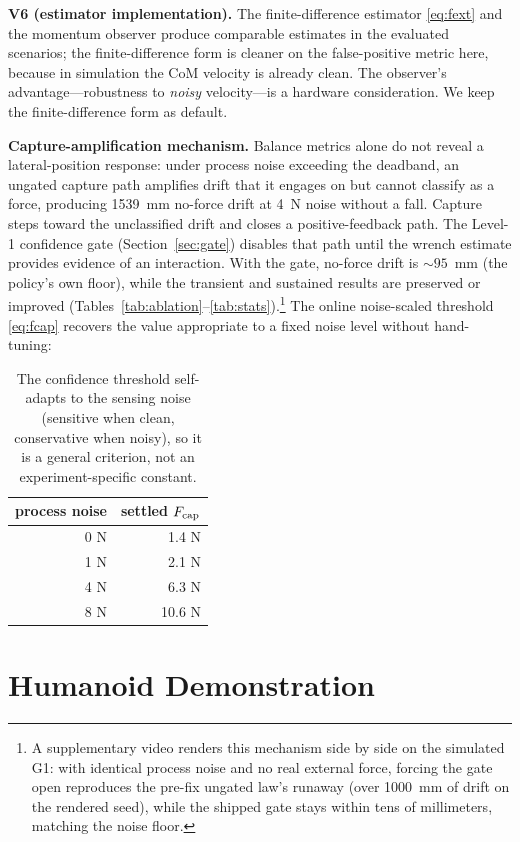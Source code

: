 \documentclass[journal]{IEEEtran}
\begin{document}
\textbf{V6 (estimator implementation).} The finite-difference estimator \eqref{eq:fext} and the momentum observer produce comparable estimates in the evaluated scenarios; the finite-difference form is cleaner on the false-positive metric here, because in simulation the CoM velocity is already clean. The observer's advantage---robustness to \emph{noisy} velocity---is a hardware consideration. We keep the finite-difference form as default.

\textbf{Capture-amplification mechanism.} Balance metrics alone do not reveal a lateral-position response: under process noise exceeding the deadband, an ungated capture path amplifies drift that it engages on but cannot classify as a force, producing 1539~mm no-force drift at 4~N noise without a fall. Capture steps toward the unclassified drift and closes a positive-feedback path. The Level-1 confidence gate (Section~\ref{sec:gate}) disables that path until the wrench estimate provides evidence of an interaction. With the gate, no-force drift is $\sim 95$~mm (the policy's own floor), while the transient and sustained results are preserved or improved (Tables~\ref{tab:ablation}--\ref{tab:stats}).\footnote{A supplementary video renders this mechanism side by side on the simulated G1: with identical process noise and no real external force, forcing the gate open reproduces the pre-fix ungated law's runaway (over 1000~mm of drift on the rendered seed), while the shipped gate stays within tens of millimeters, matching the noise floor.} The online noise-scaled threshold \eqref{eq:fcap} recovers the value appropriate to a fixed noise level without hand-tuning:

\begin{table}[t]
\caption{The confidence threshold self-adapts to the sensing noise (sensitive when clean, conservative when noisy), 
so it is a general criterion, not an experiment-specific constant.}
\label{tab:selfcal}
\centering
\begin{tabular}{rr}
\hline
process noise & settled $F_{\rm cap}$\\
\hline
0 N & 1.4 N\\
1 N & 2.1 N\\
4 N & 6.3 N\\
8 N & 10.6 N\\
\hline
\end{tabular}
\end{table}

\section{Humanoid Demonstration}
\label{sec:demo}
\end{document}
